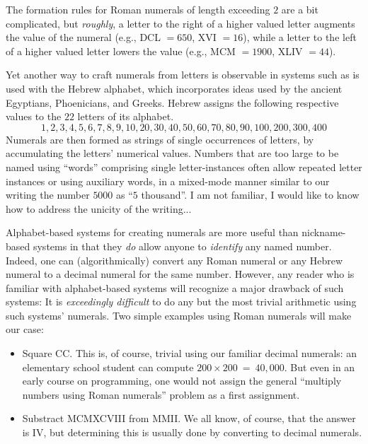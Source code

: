 \noindent
The formation rules for Roman numerals of length exceeding $2$ are a
bit complicated, but {\em roughly}, a letter to the right of a higher
valued letter augments the value of the numeral (e.g., DCL $=650$, XVI
$=16$), while a letter to the left of a higher valued letter lowers
the value (e.g., MCM $=1900$, XLIV $=44$).

Yet another way to craft numerals from letters is observable in
systems such as is used with the Hebrew alphabet, which incorporates
ideas used by the ancient Egyptians, Phoenicians, and Greeks.  Hebrew
assigns the following respective values to the $22$ letters of its
alphabet.
\[ 1, 2, 3, 4, 5, 6, 7, 8, 9, 10,
20, 30, 40, 50, 60, 70, 80, 90, 100,
 200, 300, 400
\]
Numerals are then formed as strings of single occurrences of letters,
by accumulating the letters' numerical values.  Numbers that are too
large to be named using ``words'' comprising single letter-instances
often allow repeated letter instances or using auxiliary words, in a
mixed-mode manner similar to our writing the number $5000$ as ``$5$
thousand''.
{\Denis I am not familiar, I would like to know how to address the unicity of the writing...}

Alphabet-based systems for creating numerals are more useful than
nickname-based systems in that they {\em do} allow anyone to {\em
  identify} any named number. Indeed, one can (algorithmically)
convert any Roman numeral or any Hebrew numeral to a decimal numeral
for the same number.  However, any reader who is familiar with
alphabet-based systems will recognize a major drawback of such
systems: It is {\em exceedingly difficult} to do any but the most
trivial arithmetic using such systems' numerals.  Two simple examples
using Roman numerals will make our case:
\begin{itemize}
\item
Square CC.  This is, of course, trivial using our familiar decimal
numerals: an elementary school student can compute $200 \times 200 \ =
\ 40,000$.  But even in an early course on programming, one would not
assign the general ``multiply numbers using Roman numerals'' problem
as a first assignment.

\item
Substract MCMXCVIII from MMII.  We all know, of course, that the answer
is IV, but determining this is usually done by converting to decimal numerals.
\end{itemize}

